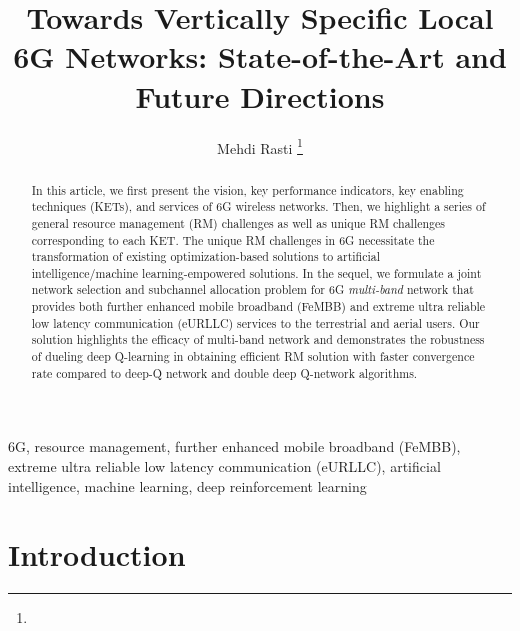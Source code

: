\documentclass[journal,twocolumn]{IEEEtran}
\begin{document}
	\title{Towards Vertically Specific Local 6G Networks: State-of-the-Art and Future Directions}
	\author{Mehdi Rasti \thanks{}}
\raggedbottom

	\maketitle	
	\begin{abstract}
	In this article, we first present the vision, key performance indicators, key enabling techniques (KETs), and services of 6G wireless networks. Then, we highlight a series of general resource management (RM) challenges as well as unique RM challenges corresponding to each KET.  The unique RM challenges in 6G necessitate the transformation of existing optimization-based solutions to artificial intelligence/machine learning-empowered solutions. In the sequel, we formulate a joint network selection and subchannel allocation problem for 6G \textit{multi-band} network that provides both further enhanced mobile broadband (FeMBB) and extreme ultra reliable low latency communication (eURLLC) services to the terrestrial and   aerial   users. Our solution highlights the efficacy of multi-band network and demonstrates the robustness of dueling deep Q-learning in obtaining efficient RM solution with faster convergence rate compared to deep-Q network and double deep Q-network algorithms. 
	
	 
	\end{abstract}

\begin{IEEEkeywords}
 6G, resource management, further enhanced mobile broadband (FeMBB), extreme ultra reliable low latency communication (eURLLC), artificial intelligence, machine learning, deep reinforcement learning   
\end{IEEEkeywords} 	
	
	\section{Introduction}
\end{document}
